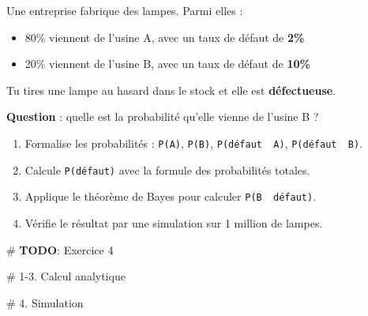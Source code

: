\documentclass[
  french,
  11pt,
  a4paper,
]{scrbook}
\newenvironment{Shaded}{}{}
\newcommand{\AlertTok}[1]{\textcolor[rgb]{1.00,0.33,0.33}{\textbf{#1}}}
\newcommand{\CommentTok}[1]{\textcolor[rgb]{0.42,0.45,0.49}{#1}}
\providecommand{\tightlist}{%
  \setlength{\itemsep}{0pt}\setlength{\parskip}{0pt}}
\begin{document}
\begin{tcolorbox}[enhanced jigsaw, arc=.35mm, bottomrule=.15mm, bottomtitle=1mm, breakable, colback=white, colbacktitle=quarto-callout-note-color!10!white, colframe=quarto-callout-note-color-frame, coltitle=black, left=2mm, leftrule=.75mm, opacityback=0, opacitybacktitle=0.6, rightrule=.15mm, title={📝 Énoncé}, titlerule=0mm, toprule=.15mm, toptitle=1mm]

Une entreprise fabrique des lampes. Parmi elles :

\begin{itemize}
\tightlist
\item
  80\% viennent de l'usine A, avec un taux de défaut de \textbf{2\%}
\item
  20\% viennent de l'usine B, avec un taux de défaut de \textbf{10\%}
\end{itemize}

Tu tires une lampe au hasard dans le stock et elle est
\textbf{défectueuse}.

\textbf{Question} : quelle est la probabilité qu'elle vienne de l'usine
B ?

\begin{enumerate}
\def\labelenumi{\arabic{enumi}.}
\tightlist
\item
  Formalise les probabilités : \texttt{P(A)}, \texttt{P(B)},
  \texttt{P(défaut\ \textbar{}\ A)}, \texttt{P(défaut\ \textbar{}\ B)}.
\item
  Calcule \texttt{P(défaut)} avec la formule des probabilités totales.
\item
  Applique le théorème de Bayes pour calculer
  \texttt{P(B\ \textbar{}\ défaut)}.
\item
  Vérifie le résultat par une simulation sur 1 million de lampes.
\end{enumerate}

\end{tcolorbox}

\begin{Shaded}
\begin{Highlighting}[]
\CommentTok{\# }\AlertTok{TODO}\CommentTok{: Exercice 4}

\CommentTok{\# 1{-}3. Calcul analytique}


\CommentTok{\# 4. Simulation}
\end{Highlighting}
\end{Shaded}
\end{document}
